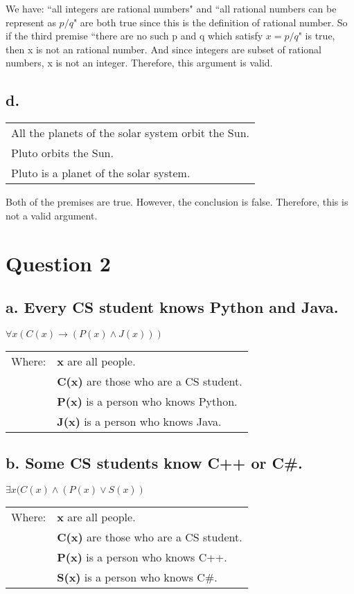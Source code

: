 \documentclass{article}
\begin{document}
 
 We have: ``all integers are rational numbers" and ``all rational numbers can be represent as $p/q$" are both true since this is the definition of rational number. So if the third premise ``there are no such p and q which satisfy $x=p/q$" is true, then x is not an rational number. And since integers are subset of rational numbers, x is not an integer. Therefore, this argument is valid.
 
 \subsection*{d.}
 \begin{tabular}{l}
     All the planets of the solar system orbit the Sun. \\
     Pluto orbits the Sun. \\ \hline
     Pluto is a planet of
the solar system.
 \end{tabular}

Both of the premises are true. However, the conclusion is false. Therefore, this is not a valid argument.

\section*{Question 2}
\subsection*{a. Every CS student knows Python and Java.}
$\forall x (C(x) \rightarrow (P(x) \land J(x)))$

\begin{tabular}{ll}
    Where: & \textbf{x} are all people. \\
    & \textbf{C(x)} are those who are a CS student. \\
    & \textbf{P(x)} is a person who knows Python.\\
    & \textbf{J(x)} is a person who knows Java.
\end{tabular}

\subsection*{b. Some CS students know C++ or C\#.}
$\exists x (C(x) \land (P(x) \lor S(x))$

\begin{tabular}{ll}
    Where: & \textbf{x} are all people. \\
    & \textbf{C(x)} are those who are a CS student. \\
    & \textbf{P(x)} is a person who knows C++.\\
    & \textbf{S(x)} is a person who knows C\#.
\end{tabular}
\end{document}
